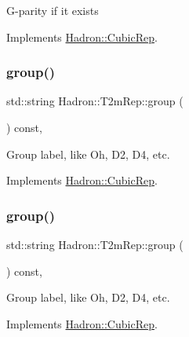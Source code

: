 G-\/parity if it exists 

Implements \mbox{\hyperlink{structHadron_1_1CubicRep_a52104e43266d1614c00bbd1c3b395458}{Hadron\+::\+Cubic\+Rep}}.

\mbox{\label{structHadron_1_1T2mRep_a2a362df9bb685dadcae8261f8a081d93}} 
\subsubsection{\texorpdfstring{group()}{group()}\hspace{0.1cm}{\footnotesize\ttfamily [1/2]}}
{\footnotesize\ttfamily std\+::string Hadron\+::\+T2m\+Rep\+::group (\begin{DoxyParamCaption}{ }\end{DoxyParamCaption}) const\hspace{0.3cm}{\ttfamily [inline]}, {\ttfamily [virtual]}}

Group label, like Oh, D2, D4, etc. 

Implements \mbox{\hyperlink{structHadron_1_1CubicRep_a0748f11ec87f387062c8e8981339a29c}{Hadron\+::\+Cubic\+Rep}}.

\mbox{\label{structHadron_1_1T2mRep_a2a362df9bb685dadcae8261f8a081d93}} 
\subsubsection{\texorpdfstring{group()}{group()}\hspace{0.1cm}{\footnotesize\ttfamily [2/2]}}
{\footnotesize\ttfamily std\+::string Hadron\+::\+T2m\+Rep\+::group (\begin{DoxyParamCaption}{ }\end{DoxyParamCaption}) const\hspace{0.3cm}{\ttfamily [inline]}, {\ttfamily [virtual]}}

Group label, like Oh, D2, D4, etc. 

Implements \mbox{\hyperlink{structHadron_1_1CubicRep_a0748f11ec87f387062c8e8981339a29c}{Hadron\+::\+Cubic\+Rep}}.

\mbox{\label{structHadron_1_1T2mRep_a7b3ba7f0e39ae3d4f8f377ab928fafee}} 
